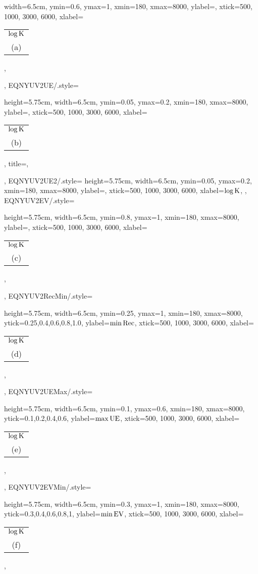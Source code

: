 {{        width=6.5cm,
        ymin=0.6,
        ymax=1,
        xmin=180,
        xmax=8000,
        ylabel=\Rec,
        xtick={500, 1000, 3000, 6000},
        xlabel=\begin{tabular}{c}$\log\text{K}$\\(a)\end{tabular},
    },
    EQNYUV2UE/.style={
        height=5.75cm,
        width=6.5cm,
        ymin=0.05,
        ymax=0.2,
        xmin=180,
        xmax=8000,
        ylabel=\UE,
        xtick={500, 1000, 3000, 6000},
        xlabel=\begin{tabular}{c}$\log\text{K}$\\(b)\end{tabular},
        title=\NYU,
    },
    EQNYUV2UE2/.style={
        height=5.75cm,
        width=6.5cm,
        ymin=0.05,
        ymax=0.2,
        xmin=180,
        xmax=8000,
        ylabel=\UE,
        xtick={500, 1000, 3000, 6000},
        xlabel=$\log\text{K}$,
    },
    EQNYUV2EV/.style={
        height=5.75cm,
        width=6.5cm,
        ymin=0.8,
        ymax=1,
        xmin=180,
        xmax=8000,
        ylabel=\EV,
        xtick={500, 1000, 3000, 6000},
        xlabel=\begin{tabular}{c}$\log\text{K}$\\(c)\end{tabular},
    },
    EQNYUV2RecMin/.style={
        height=5.75cm,
        width=6.5cm,
        ymin=0.25,
        ymax=1,
        xmin=180,
        xmax=8000,
        ytick={0.25,0.4,0.6,0.8,1.0},
        ylabel=$\min\text{Rec}$,
        xtick={500, 1000, 3000, 6000},
        xlabel=\begin{tabular}{c}$\log\text{K}$\\(d)\end{tabular},
    },
    EQNYUV2UEMax/.style={
        height=5.75cm,
        width=6.5cm,
        ymin=0.1,
        ymax=0.6,
        xmin=180,
        xmax=8000,
        ytick={0.1,0.2,0.4,0.6},
        ylabel=$\max\text{UE}$,
        xtick={500, 1000, 3000, 6000},
        xlabel=\begin{tabular}{c}$\log\text{K}$\\(e)\end{tabular},
    },
    EQNYUV2EVMin/.style={
        height=5.75cm,
        width=6.5cm,
        ymin=0.3,
        ymax=1,
        xmin=180,
        xmax=8000,
        ytick={0.3,0.4,0.6,0.8,1},
        ylabel=$\min\text{EV}$,
        xtick={500, 1000, 3000, 6000},
        xlabel=\begin{tabular}{c}$\log\text{K}$\\(f)\end{tabular},
}}
